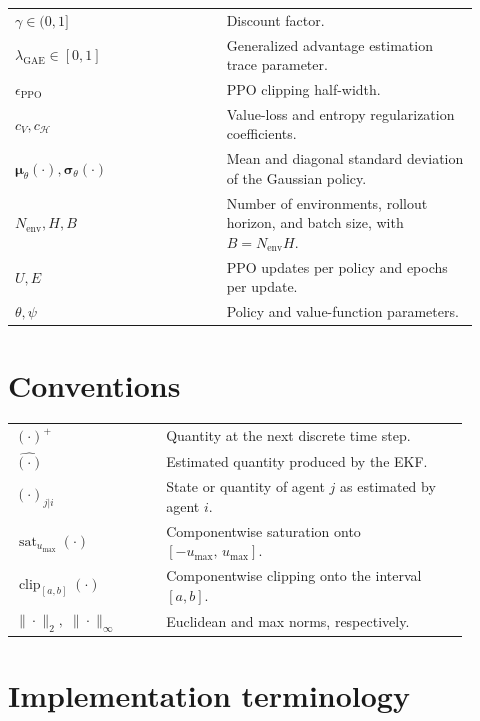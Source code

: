 \begin{longtable}{>{\raggedright\arraybackslash}p{0.42\linewidth}
                  >{\raggedright\arraybackslash}p{0.50\linewidth}}
\(\gamma \in (0,1]\) & Discount factor.\\
\(\lambda_{\mathrm{GAE}}\in[0,1]\) & Generalized advantage estimation trace parameter.\\
\(\epsilon_{\mathrm{PPO}}\) & PPO clipping half-width.\\
\(c_V, c_{\mathcal{H}}\) & Value-loss and entropy regularization coefficients.\\
\(\boldsymbol{\mu}_\theta(\cdot),\boldsymbol{\sigma}_\theta(\cdot)\) & Mean and diagonal standard deviation of the Gaussian policy.\\
\(N_{\mathrm{env}},H,B\) & Number of environments, rollout horizon, and batch size, with \(B=N_{\mathrm{env}}H\).\\
\(U,E\) & PPO updates per policy and epochs per update.\\
\(\theta,\psi\) & Policy and value-function parameters.\\
\end{longtable}

\section{Conventions}
\label{appendix:methodology-conventions}

\begin{center}
\renewcommand{\arraystretch}{1.15}
\begin{tabular}{p{0.30\linewidth}p{0.60\linewidth}}
\((\cdot)^{+}\) & Quantity at the next discrete time step.\\
\(\hat{(\cdot)}\) & Estimated quantity produced by the EKF.\\
\((\cdot)_{j|i}\) & State or quantity of agent \(j\) as estimated by agent \(i\).\\
\(\operatorname{sat}_{u_{\max}}(\cdot)\) & Componentwise saturation onto \([ -u_{\max},\,u_{\max}]\).\\
\(\operatorname{clip}_{[a,b]}(\cdot)\) & Componentwise clipping onto the interval \([a,b]\).\\
\(\|\cdot\|_2,\;\|\cdot\|_\infty\) & Euclidean and max norms, respectively.\\
\end{tabular}
\end{center}

\section{Implementation terminology}
\label{appendix:methodology-implementation-terminology}

